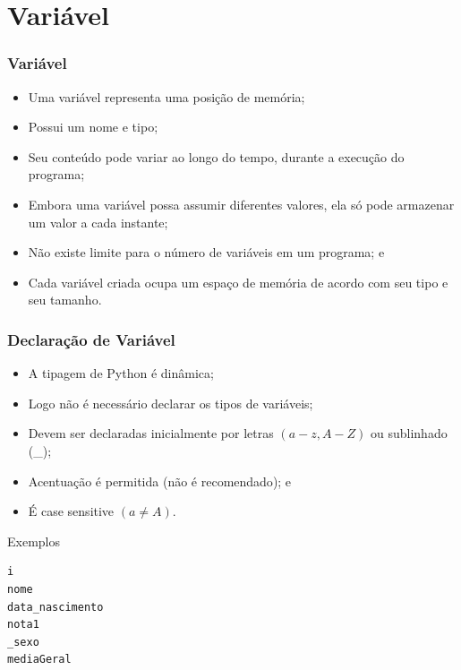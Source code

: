 \documentclass[aspectratio=169]{beamer} %
\begin{document}
\section{Variável}

\begin{frame}
\frametitle{Variável}

\begin{itemize}
	\item Uma variável representa uma posição de memória;
	\item Possui um nome e tipo;
	\item Seu conteúdo pode variar ao longo do tempo, durante a execução do
	programa;
	\item Embora uma variável possa assumir diferentes valores, ela só pode
	armazenar um valor a cada instante;
	\item Não existe limite para o número de variáveis em um programa; e
	\item Cada variável criada ocupa um espaço de memória de acordo com seu
	tipo e seu tamanho.
\end{itemize}

\end{frame}

\begin{frame}[fragile]
\frametitle{Declaração de Variável}

\begin{itemize}
	\item A tipagem de Python é dinâmica;
	\item Logo não é necessário declarar os tipos de variáveis;
	\item Devem ser declaradas inicialmente por letras $(a - z, A - Z)$ ou sublinhado (\_);
	\item Acentuação é permitida (\alert{não é recomendado}); e
	\item É case sensitive $(a \neq A)$.
\end{itemize}\vfill

\begin{exampleblock}{Exemplos}
	\begin{lstlisting}	
i
nome
data_nascimento
nota1
_sexo
mediaGeral
	\end{lstlisting}
\end{exampleblock}
\end{frame}
\end{document}
